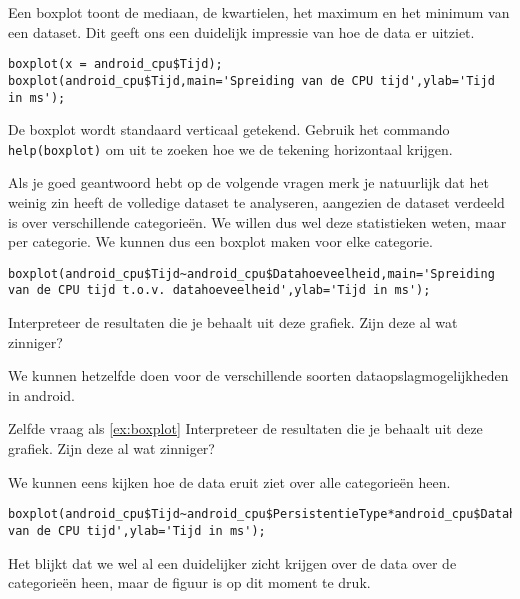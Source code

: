 Een boxplot toont de mediaan, de kwartielen, het maximum en het minimum van een dataset. Dit geeft ons een duidelijk impressie van hoe de data er uitziet.

\begin{lstlisting}
boxplot(x = android_cpu$Tijd);
boxplot(android_cpu$Tijd,main='Spreiding van de CPU tijd',ylab='Tijd in ms');
\end{lstlisting} 

\begin{exercise}
	De boxplot wordt standaard verticaal getekend. Gebruik het commando \texttt{help(boxplot)} om uit te zoeken hoe we de tekening horizontaal krijgen. 
\end{exercise}

Als je goed geantwoord hebt op de volgende vragen merk je natuurlijk dat het weinig zin heeft de volledige dataset te analyseren, aangezien de dataset verdeeld is over verschillende categorie\"en. We willen dus wel deze statistieken weten, maar per categorie. We kunnen dus een boxplot maken voor elke categorie.

\begin{lstlisting}
boxplot(android_cpu$Tijd~android_cpu$Datahoeveelheid,main='Spreiding van de CPU tijd t.o.v. datahoeveelheid',ylab='Tijd in ms');
\end{lstlisting}

\begin{exercise}
	\label{ex:boxplot}
	Interpreteer de resultaten die je behaalt uit deze grafiek. Zijn deze al wat zinniger?
\end{exercise}

We kunnen hetzelfde doen voor de verschillende soorten dataopslagmogelijkheden in android.

\begin{exercise}
	Zelfde vraag als \ref{ex:boxplot} Interpreteer de resultaten die je behaalt uit deze grafiek. Zijn deze al wat zinniger?
\end{exercise}

We kunnen eens kijken hoe de data eruit ziet over alle categorie\"en heen.

\begin{lstlisting}
boxplot(android_cpu$Tijd~android_cpu$PersistentieType*android_cpu$Datahoeveelheid,main='Spreiding van de CPU tijd',ylab='Tijd in ms');
\end{lstlisting}

Het blijkt dat we wel al een duidelijker zicht krijgen over de data over de categorie\"en heen, maar de figuur is op dit moment te druk. 

